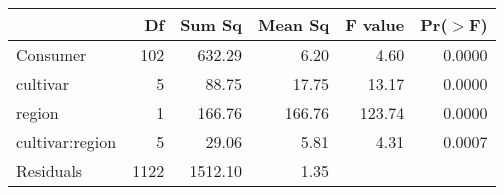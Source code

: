 \begin{tabular}{lrrrrr}
  \hline
 & Df & Sum Sq & Mean Sq & F value & Pr($>$F) \\ 
  \hline
Consumer & 102 & 632.29 & 6.20 & 4.60 & 0.0000 \\ 
  cultivar & 5 & 88.75 & 17.75 & 13.17 & 0.0000 \\ 
  region & 1 & 166.76 & 166.76 & 123.74 & 0.0000 \\ 
  cultivar:region & 5 & 29.06 & 5.81 & 4.31 & 0.0007 \\ 
  Residuals & 1122 & 1512.10 & 1.35 &  &  \\ 
   \hline
\end{tabular}
